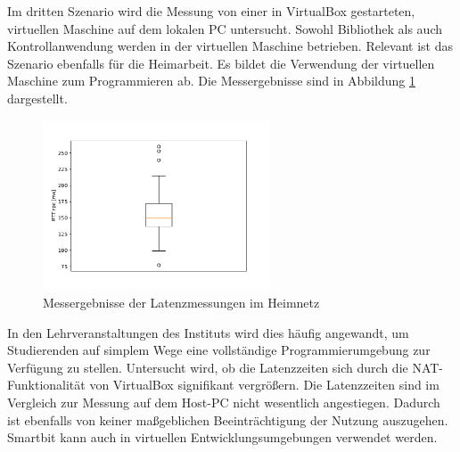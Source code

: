 \documentclass[11pt,a4paper]{report}
\begin{document}
Im dritten Szenario wird die Messung von einer in VirtualBox gestarteten, virtuellen Maschine auf dem lokalen PC untersucht.
Sowohl Bibliothek als auch Kontrollanwendung werden in der virtuellen Maschine betrieben.
Relevant ist das Szenario ebenfalls für die Heimarbeit.
Es bildet die Verwendung der virtuellen Maschine zum Programmieren ab.
Die Messergebnisse sind in Abbildung \ref{fig:measure_vm} dargestellt.
\begin{figure}[htbp]
  \centering
  \includegraphics[width=0.6\textwidth]{images/timing_vm}
  \caption{Messergebnisse der Latenzmessungen im Heimnetz}
  \label{fig:measure_vm}
\end{figure}
In den Lehrveranstaltungen des Instituts wird dies häufig angewandt, um Studierenden auf simplem Wege eine vollständige Programmierumgebung zur Verfügung zu stellen. 
Untersucht wird, ob die Latenzzeiten sich durch die NAT-Funktionalität von VirtualBox signifikant vergrößern.
Die Latenzzeiten sind im Vergleich zur Messung auf dem Host-PC nicht wesentlich angestiegen.
Dadurch ist ebenfalls von keiner maßgeblichen Beeinträchtigung der Nutzung auszugehen.
Smartbit kann auch in virtuellen Entwicklungsumgebungen verwendet werden.
\end{document}

